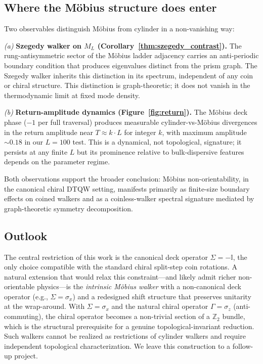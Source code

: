\documentclass[aps,pra,reprint,amsmath,amssymb,superscriptaddress,nofootinbib,longbibliography]{revtex4-2}
\newcommand{\Z}{\mathbb{Z}}
\newcommand{\I}{\mathbb{I}}
\newcommand{\sigx}{\sigma_x}
\newcommand{\sigz}{\sigma_z}
\begin{document}
\subsection{Where the M\"obius structure does enter}

Two observables distinguish M\"obius from cylinder in a non-vanishing way:

\textit{(a)} \textbf{Szegedy walker on $M_L$ (Corollary~\ref{thm:szegedy_contrast}).} The rung-antisymmetric sector of the M\"obius ladder adjacency carries an anti-periodic boundary condition that produces eigenvalues distinct from the prism graph. The Szegedy walker inherits this distinction in its spectrum, independent of any coin or chiral structure. This distinction is graph-theoretic; it does not vanish in the thermodynamic limit at fixed mode density.

\textit{(b)} \textbf{Return-amplitude dynamics (Figure~\ref{fig:return}).} The M\"obius deck phase ($-1$ per full traversal) produces measurable cylinder-vs-M\"obius divergences in the return amplitude near $T \approx k \cdot L$ for integer $k$, with maximum amplitude $\sim 0.18$ in our $L = 100$ test. This is a dynamical, not topological, signature; it persists at any finite $L$ but its prominence relative to bulk-dispersive features depends on the parameter regime.

Both observations support the broader conclusion: M\"obius non-orientability, in the canonical chiral DTQW setting, manifests primarily as finite-size boundary effects on coined walkers and as a coinless-walker spectral signature mediated by graph-theoretic symmetry decomposition.

\subsection{Outlook}
\label{sec:outlook}

The central restriction of this work is the canonical deck operator $\Sigma = -\I$, the only choice compatible with the standard chiral split-step coin rotations. A natural extension that would relax this constraint---and likely admit richer non-orientable physics---is the \emph{intrinsic M\"obius walker} with a non-canonical deck operator (e.g., $\Sigma = \sigx$) and a redesigned shift structure that preserves unitarity at the wrap-around. With $\Sigma = \sigx$ and the natural chiral operator $\Gamma = \sigz$ (anti-commuting), the chiral operator becomes a non-trivial section of a $\Z_2$ bundle, which is the structural prerequisite for a genuine topological-invariant reduction. Such walkers cannot be realized as restrictions of cylinder walkers and require independent topological characterization. We leave this construction to a follow-up project.
\end{document}
